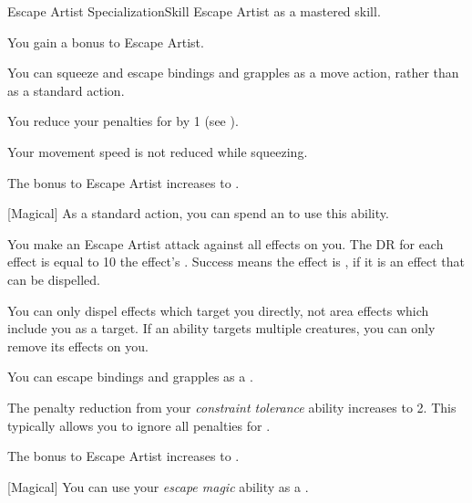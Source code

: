     \begin{feat}{Escape Artist Specialization}{Skill}
        \featpre Escape Artist as a mastered skill.
        \featben

         You gain a  bonus to Escape Artist.

         You can squeeze and escape bindings and grapples as a move action, rather than as a standard action.

         You reduce your penalties for  by 1 (see ).

         Your movement speed is not reduced while squeezing.

         The bonus to Escape Artist increases to .

        [Magical] As a standard action, you can spend an  to use this ability.
        \begin{ability}
            \begin{spelleffects}
                \spelleffect You make an Escape Artist attack against all  effects on you.
                The DR for each effect is equal to 10 \add the effect's .
                Success means the effect is , if it is an effect that can be dispelled.
                \par You can only dispel effects which target you directly, not area effects which include you as a target.
                If an ability targets multiple creatures, you can only remove its effects on you.
            \end{spelleffects}
        \end{ability}

         You can escape bindings and grapples as a .

         The penalty reduction from your \textit{constraint tolerance} ability increases to 2.
        This typically allows you to ignore all penalties for .

         The bonus to Escape Artist increases to .

        [Magical] You can use your \textit{escape magic} ability as a .
    \end{feat}

